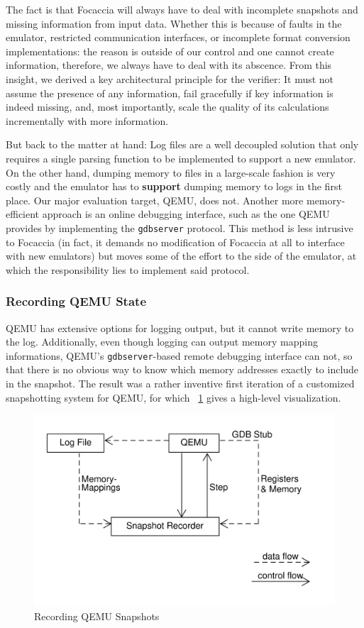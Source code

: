 The fact is that Focaccia will always have to deal with incomplete snapshots and missing information from input data.
Whether this is because of faults in the emulator, restricted communication interfaces, or incomplete format conversion
implementations: the reason is outside of our control and one cannot create information, therefore, we always have to
deal with its abscence. From this insight, we derived a key architectural principle for the verifier: It must not assume
the presence of any information, fail gracefully if key information is indeed missing, and, most importantly, scale the
quality of its calculations incrementally with more information.

But back to the matter at hand: Log files are a well decoupled solution that only requires a single parsing function to
be implemented to support a new emulator. On the other hand, dumping memory to files in a large-scale fashion is very
costly and the emulator has to \textbf{support} dumping memory to logs in the first place. Our major evaluation target,
QEMU, does not. Another more memory-efficient approach is an online debugging interface, such as the one QEMU provides
by implementing the \texttt{gdbserver} protocol. This method is less intrusive to Focaccia (in fact, it demands no
modification of Focaccia at all to interface with new emulators) but moves some of the effort to the side of the
emulator, at which the responsibility lies to implement said protocol.

\subsubsection{Recording QEMU State}

QEMU has extensive options for logging output, but it cannot write memory to the log. Additionally, even though logging
can output memory mapping informations, QEMU's \texttt{gdbserver}-based remote debugging interface can not, so that
there is no obvious way to know which memory addresses exactly to include in the snapshot. The result was a rather
inventive first iteration of a customized snapshotting system for QEMU, for which
\figurename~\ref{fig:qemu_naive_recording} gives a high-level visualization.

\begin{figure}[htpb]
    \centering
    \includegraphics[width=0.8\linewidth]{figures/qemu_naive_recording.png}
    \caption{Recording QEMU Snapshots}\label{fig:qemu_naive_recording}
\end{figure}

